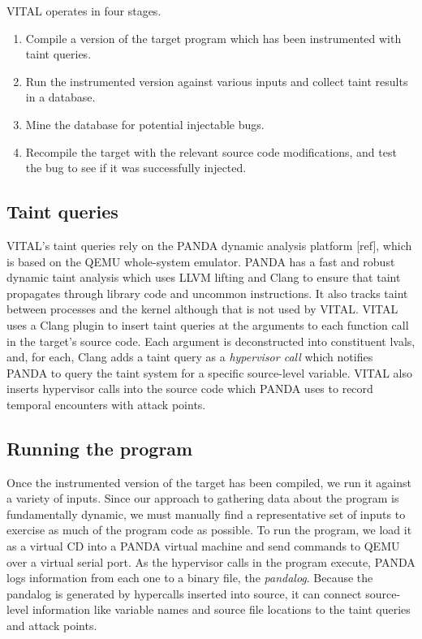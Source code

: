 VITAL operates in four stages.
\begin{enumerate}
\item Compile a version of the target program which has been instrumented with taint queries.
\item Run the instrumented version against various inputs and collect taint results  in a database.
\item Mine the database for potential injectable bugs.
\item Recompile the target with the relevant source code modifications, and test the bug to see if it was successfully injected.
\end{enumerate}

\subsection{Taint queries}
VITAL's taint queries rely on the PANDA dynamic analysis platform [ref], which is based on the QEMU whole-system emulator.
PANDA has a fast and robust dynamic taint analysis which uses LLVM lifting and Clang to ensure that taint propagates through library code and uncommon instructions.
It also tracks taint between processes and the kernel although that is not used by VITAL.
VITAL uses a Clang plugin to insert taint queries at the arguments to each function call in the target's source code.
Each argument is deconstructed into constituent lvals, and, for each, Clang adds a taint query as a \emph{hypervisor call} which notifies PANDA to query the taint system for a specific source-level variable.
VITAL also inserts hypervisor calls into the source code which PANDA uses to record temporal encounters with attack points.

\subsection{Running the program}
Once the instrumented version of the target has been compiled, we run it against a variety of inputs.
Since our approach to gathering data about the program is fundamentally dynamic, we must manually find a representative set of inputs to exercise as much of the program code as possible.
To run the program, we load it as a virtual CD into a PANDA virtual machine and send commands to QEMU over a virtual serial port.
As the hypervisor calls in the program execute, PANDA logs information from each one to a binary file, the \emph{pandalog}.
Because the pandalog is generated by hypercalls inserted into source, it can connect source-level information like variable names and source file locations to the taint queries and attack points.


